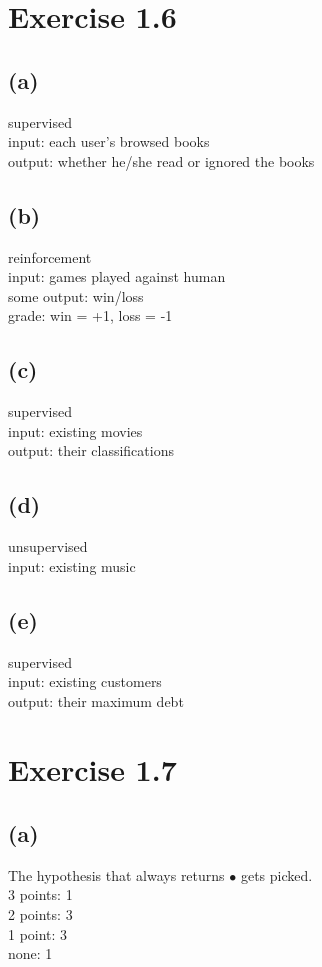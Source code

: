 \documentclass{article}
\begin{document}
	\section*{Exercise 1.6}
	\subsection*{(a)}
		supervised\\
		input: each user's browsed books\\
		output: whether he/she read or ignored the books
	\subsection*{(b)}
		reinforcement\\
		input: games played against human\\
		some output: win/loss\\
		grade: win = +1, loss = -1
	\subsection*{(c)}
		supervised\\
		input: existing movies\\
		output: their classifications
	\subsection*{(d)}
		unsupervised\\
		input: existing music
	\subsection*{(e)}
		supervised\\
		input: existing customers\\
		output: their maximum debt
		
	\section*{Exercise 1.7}
	\subsection*{(a)}
		The hypothesis that always returns $\bullet$ gets picked.\\
		3 points: 1\\
		2 points: 3\\
		1 point: 3\\
		none: 1
		
\end{document}
